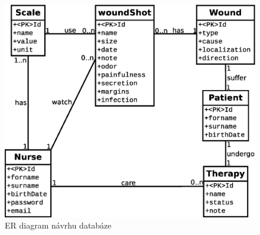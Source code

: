 \begin{figure}[h]
      \centering
      \includegraphics[scale=0.50]{fig/erd.eps}
      \caption{ER diagram návrhu databáze}
      \label{fig:erd}
\end{figure}

